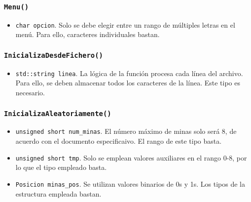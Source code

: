 \documentclass[12pt]{article}
\begin{document}
\subsubsection*{\texttt{Menu()}}

\begin{itemize}

\item \texttt{char opcion}. Solo se debe elegir entre un rango de
múltiples letras en el menú. Para ello, caracteres individuales bastan.

\end{itemize}

\subsubsection*{\texttt{InicializaDesdeFichero()}}

\begin{itemize}

\item \texttt{std::string linea}. La lógica de la función procesa
cada línea del archivo. Para ello, se deben almacenar todos los caracteres de la
línea. Este tipo es necesario.

\end{itemize}

\subsubsection*{\texttt{InicializaAleatoriamente()}}

\begin{itemize}

\item \texttt{unsigned short num_minas}. El número máximo de minas solo
será 8, de acuerdo con el documento especificaivo. El rango de este tipo basta.

\item \texttt{unsigned short tmp}. Solo se emplean valores auxiliares
en el rango 0-8, por lo que el tipo empleado basta.

\item \texttt{Posicion minas_pos}. Se utilizan valores binarios de 0s y
1s. Los tipos de la estructura empleada bastan.

\end{itemize}
\end{document}
